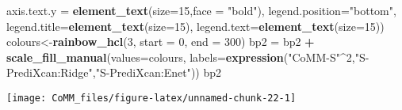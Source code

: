 \documentclass[]{article}
\newenvironment{Shaded}{\begin{snugshade}}{\end{snugshade}}
\newcommand{\KeywordTok}[1]{\textcolor[rgb]{0.13,0.29,0.53}{\textbf{#1}}}
\newcommand{\DataTypeTok}[1]{\textcolor[rgb]{0.13,0.29,0.53}{#1}}
\newcommand{\DecValTok}[1]{\textcolor[rgb]{0.00,0.00,0.81}{#1}}
\newcommand{\StringTok}[1]{\textcolor[rgb]{0.31,0.60,0.02}{#1}}
\newcommand{\OperatorTok}[1]{\textcolor[rgb]{0.81,0.36,0.00}{\textbf{#1}}}
\newcommand{\NormalTok}[1]{#1}
\begin{document}
\begin{Shaded}
\begin{Highlighting}[]
          \DataTypeTok{axis.text.y =} \KeywordTok{element_text}\NormalTok{(}\DataTypeTok{size=}\DecValTok{15}\NormalTok{,}\DataTypeTok{face =} \StringTok{"bold"}\NormalTok{),}
          \DataTypeTok{legend.position=}\StringTok{"bottom"}\NormalTok{,}
          \DataTypeTok{legend.title=}\KeywordTok{element_text}\NormalTok{(}\DataTypeTok{size=}\DecValTok{15}\NormalTok{),}
          \DataTypeTok{legend.text=}\KeywordTok{element_text}\NormalTok{(}\DataTypeTok{size=}\DecValTok{15}\NormalTok{))}
\NormalTok{  colours<-}\KeywordTok{rainbow_hcl}\NormalTok{(}\DecValTok{3}\NormalTok{, }\DataTypeTok{start =} \DecValTok{0}\NormalTok{, }\DataTypeTok{end =} \DecValTok{300}\NormalTok{)}
\NormalTok{  bp2 =}\StringTok{ }\NormalTok{bp2 }\OperatorTok{+}\StringTok{ }\KeywordTok{scale_fill_manual}\NormalTok{(}\DataTypeTok{values=}\NormalTok{colours, }\DataTypeTok{labels=}\KeywordTok{expression}\NormalTok{(}\StringTok{"CoMM-S"}\OperatorTok{^}\DecValTok{2}\NormalTok{,}\StringTok{"S-PrediXcan:Ridge"}\NormalTok{,}\StringTok{"S-PrediXcan:Enet"}\NormalTok{))}
\NormalTok{bp2}
\end{Highlighting}
\end{Shaded}

\begin{center}\texttt{[image: CoMM\_files/figure-latex/unnamed-chunk-22-1]} \end{center}
\end{document}
